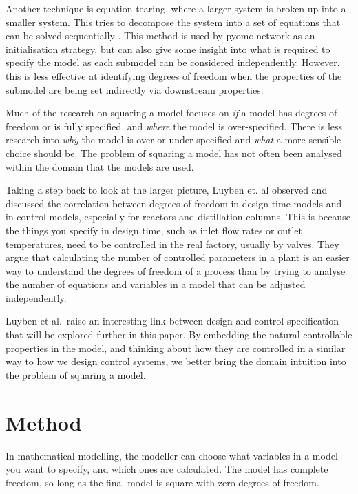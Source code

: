 Another technique is equation tearing, where a larger system is broken
up into a smaller system. This tries to decompose the system into a set
of equations that can be solved sequentially \citep{bahainv2016tearing}.
This method is used by pyomo.network \citep{bynum2021pyomo} as an
initialisation strategy, but can also give some insight into what is
required to specify the model as each submodel can be considered
independently. However, this is less effective at identifying degrees of
freedom when the properties of the submodel are being set indirectly via
downstream properties.

Much of the research on squaring a model focuses on \emph{if} a model
has degrees of freedom or is fully specified, and \emph{where} the model
is over-specified. There is less research into \emph{why} the model is
over or under specified and \emph{what} a more sensible choice should
be. The problem of squaring a model has not often been analysed within
the domain that the models are used.

Taking a step back to look at the larger picture, Luyben et. al
\citep{luyben1996design} observed and discussed the correlation between
degrees of freedom in design-time models and in control models,
especially for reactors and distillation columns. This is because the
things you specify in design time, such as inlet flow rates or outlet
temperatures, need to be controlled in the real factory, usually by
valves. They argue that calculating the number of controlled parameters
in a plant is an easier way to understand the degrees of freedom of a
process than by trying to analyse the number of equations and variables
in a model that can be adjusted independently.

Luyben et al.~raise an interesting link between design and control
specification that will be explored further in this paper. By embedding
the natural controllable properties in the model, and thinking about how
they are controlled in a similar way to how we design control systems,
we better bring the domain intuition into the problem of squaring a
model.

\hypertarget{method}{%
\section{Method}\label{method}}

In mathematical modelling, the modeller can choose what variables in a
model you want to specify, and which ones are calculated. The model has
complete freedom, so long as the final model is square with zero degrees
of freedom.

